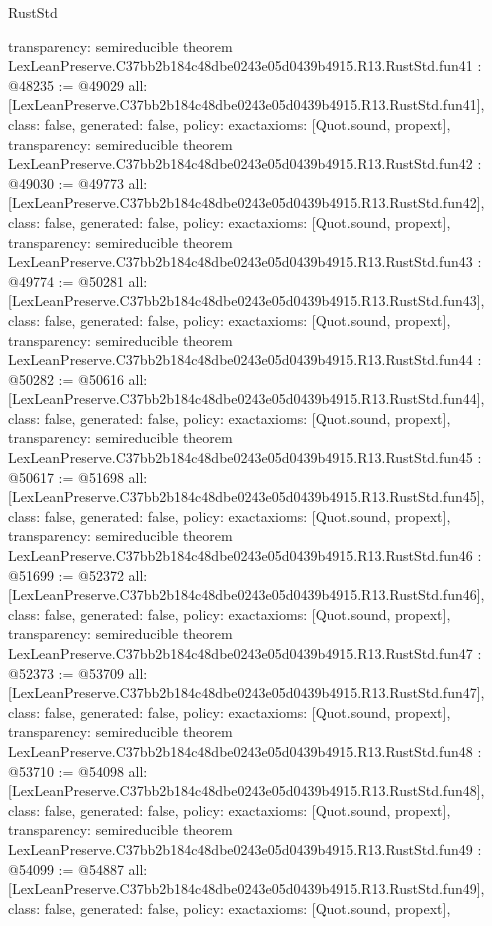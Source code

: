 \begin{lexlean}{RustStd}
\begin{coremodule}
{  transparency: semireducible
}
theorem LexLeanPreserve.C37bb2b184c48dbe0243e05d0439b4915.R13.RustStd.fun41 : @48235 := @49029 {
  all: [LexLeanPreserve.C37bb2b184c48dbe0243e05d0439b4915.R13.RustStd.fun41],
  class: false,
  generated: false,
  policy: exact{axioms: [Quot.sound, propext]},
  transparency: semireducible
}
theorem LexLeanPreserve.C37bb2b184c48dbe0243e05d0439b4915.R13.RustStd.fun42 : @49030 := @49773 {
  all: [LexLeanPreserve.C37bb2b184c48dbe0243e05d0439b4915.R13.RustStd.fun42],
  class: false,
  generated: false,
  policy: exact{axioms: [Quot.sound, propext]},
  transparency: semireducible
}
theorem LexLeanPreserve.C37bb2b184c48dbe0243e05d0439b4915.R13.RustStd.fun43 : @49774 := @50281 {
  all: [LexLeanPreserve.C37bb2b184c48dbe0243e05d0439b4915.R13.RustStd.fun43],
  class: false,
  generated: false,
  policy: exact{axioms: [Quot.sound, propext]},
  transparency: semireducible
}
theorem LexLeanPreserve.C37bb2b184c48dbe0243e05d0439b4915.R13.RustStd.fun44 : @50282 := @50616 {
  all: [LexLeanPreserve.C37bb2b184c48dbe0243e05d0439b4915.R13.RustStd.fun44],
  class: false,
  generated: false,
  policy: exact{axioms: [Quot.sound, propext]},
  transparency: semireducible
}
theorem LexLeanPreserve.C37bb2b184c48dbe0243e05d0439b4915.R13.RustStd.fun45 : @50617 := @51698 {
  all: [LexLeanPreserve.C37bb2b184c48dbe0243e05d0439b4915.R13.RustStd.fun45],
  class: false,
  generated: false,
  policy: exact{axioms: [Quot.sound, propext]},
  transparency: semireducible
}
theorem LexLeanPreserve.C37bb2b184c48dbe0243e05d0439b4915.R13.RustStd.fun46 : @51699 := @52372 {
  all: [LexLeanPreserve.C37bb2b184c48dbe0243e05d0439b4915.R13.RustStd.fun46],
  class: false,
  generated: false,
  policy: exact{axioms: [Quot.sound, propext]},
  transparency: semireducible
}
theorem LexLeanPreserve.C37bb2b184c48dbe0243e05d0439b4915.R13.RustStd.fun47 : @52373 := @53709 {
  all: [LexLeanPreserve.C37bb2b184c48dbe0243e05d0439b4915.R13.RustStd.fun47],
  class: false,
  generated: false,
  policy: exact{axioms: [Quot.sound, propext]},
  transparency: semireducible
}
theorem LexLeanPreserve.C37bb2b184c48dbe0243e05d0439b4915.R13.RustStd.fun48 : @53710 := @54098 {
  all: [LexLeanPreserve.C37bb2b184c48dbe0243e05d0439b4915.R13.RustStd.fun48],
  class: false,
  generated: false,
  policy: exact{axioms: [Quot.sound, propext]},
  transparency: semireducible
}
theorem LexLeanPreserve.C37bb2b184c48dbe0243e05d0439b4915.R13.RustStd.fun49 : @54099 := @54887 {
  all: [LexLeanPreserve.C37bb2b184c48dbe0243e05d0439b4915.R13.RustStd.fun49],
  class: false,
  generated: false,
  policy: exact{axioms: [Quot.sound, propext]},
}
\end{coremodule}
\end{lexlean}
